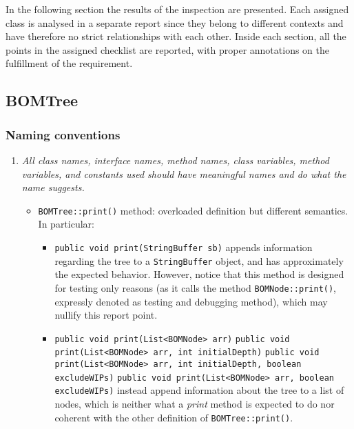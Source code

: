 In the following section the results of the inspection are presented.\newline
Each assigned class is analysed in a separate report since they belong to different contexts and have therefore no strict relationships with each other. Inside each section, all the points in the assigned checklist are reported, with proper annotations on the fulfillment of the requirement.

\subsection{BOMTree}
	\subsubsection{Naming conventions}
		\begin{enumerate}
			\setcounter{enumi}{0}
			\item \textit{All class names, interface names, method names, class variables, method variables, and constants used should have meaningful names and do what the name suggests.}
			\begin{itemize}
				\item \texttt{BOMTree::print()} method: overloaded definition but different semantics. In particular:
				\begin{itemize}
					\item \texttt{public void print(StringBuffer sb)}\newline
					appends information regarding the tree to a \texttt{StringBuffer} object, and has approximately the expected behavior. However, notice that this method is  designed for testing only reasons (as it calls the method \texttt{BOMNode::print()}, expressly denoted as testing and debugging method), which may nullify this report point.
					\item \texttt{public void print(List<BOMNode> arr)}\newline
					\texttt{public void print(List<BOMNode> arr, int initialDepth)}\newline
					\texttt{public void print(List<BOMNode> arr, int initialDepth, boolean excludeWIPs)}\newline
					\texttt{public void print(List<BOMNode> arr, boolean excludeWIPs)}\newline
					instead append information about the tree to a list of nodes, which is neither what a \textit{print} method is expected to do nor coherent with the other definition of \texttt{BOMTree::print()}.
				\end{itemize}
			\end{itemize}


\end{enumerate}
